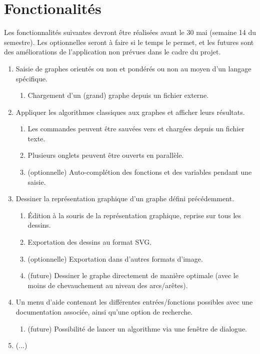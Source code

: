 \documentclass[french]{article}
\begin{document}
	\section{Fonctionalités}
		Les fonctionnalités suivantes devront être réalisées avant le 30 mai (semaine 14 du semestre). Les optionnelles seront à faire si le temps le permet, et les futures sont des améliorations de l'application non prévues dans le cadre du projet.
		\begin{enumerate}
			\item Saisie de graphes orientés ou non et pondérés ou non au moyen d'un langage spécifique.
			\begin{enumerate}
				\item Chargement d'un (grand) graphe depuis un fichier externe.
			\end{enumerate}
			
			\item Appliquer les algorithmes classiques aux graphes et afficher leurs résultats.
			\begin{enumerate}
				\item Les commandes peuvent être sauvées vers et chargées depuis un fichier texte.
				\item Plusieurs onglets peuvent être ouverts en parallèle.
				\item (optionnelle) Auto-complétion des fonctions et des variables pendant une saisie.
			\end{enumerate}
			
			\item Dessiner la représentation graphique d'un graphe défini précédemment.
			\begin{enumerate}
				\item Édition à la souris de la représentation graphique, reprise sur tous les dessins.
				\item Exportation des dessins au format SVG.
				\item (optionnelle) Exportation dans d'autres formats d'image.
				\item (future) Dessiner le graphe directement de manière optimale (avec le moins de chevauchement au niveau des arcs/arêtes).
			\end{enumerate}
			
			\item Un menu d'aide contenant les différentes entrées/fonctions possibles avec une documentation associée, ainsi qu'une option de recherche.
			\begin{enumerate}
				\item (future) Possibilité de lancer un algorithme via une fenêtre de dialogue.
			\end{enumerate}
		
			\item (...)
		\end{enumerate}
		
\end{document}
